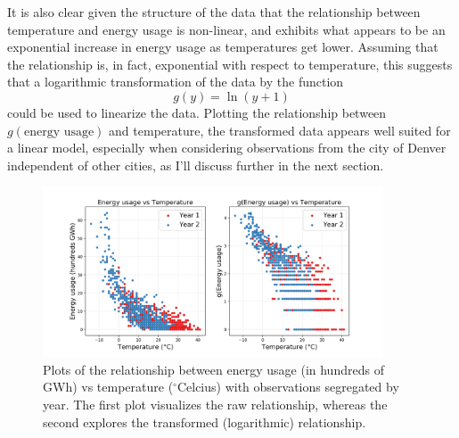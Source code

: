 \documentclass[11pt]{article}
\begin{document}
It is also clear given the structure of the data that the relationship between temperature and energy usage is non-linear, and exhibits what appears to be an exponential increase in energy usage as temperatures get lower. Assuming that the relationship is, in fact, exponential with respect to temperature, this suggests that a logarithmic transformation of the data by the function
\begin{equation} \label{eqn:g}
  g(y) = \ln(y+1)
\end{equation}
could be used to linearize the data. Plotting the relationship between $g(\text{energy usage})$ and temperature, the transformed data appears well suited for a linear model, especially when considering observations from the city of Denver independent of other cities, as I'll discuss further in the next section.

\begin{figure}[ht] \centering
  \includegraphics[width=0.9\textwidth]{exploratory2.png}
  \caption{Plots of the relationship between energy usage (in hundreds of GWh) vs temperature ($^\circ$Celcius) with observations segregated by year. The first plot visualizes the raw relationship, whereas the second explores the transformed (logarithmic) relationship.}
  \label{fig:exploratory2}
\end{figure}
\end{document}
